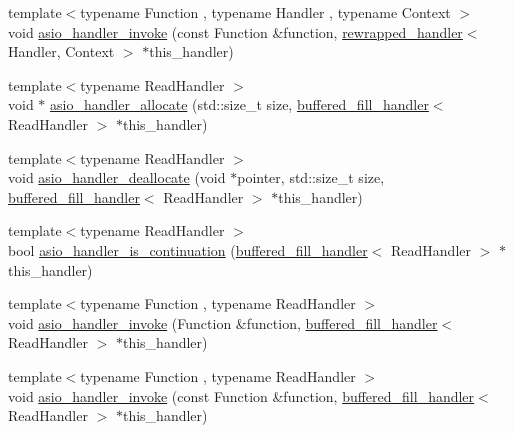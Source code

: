 \begin{DoxyCompactItemize}
\item 
{\footnotesize template$<$typename Function , typename Handler , typename Context $>$ }\\void \hyperlink{namespaceasio_1_1detail_a689ca19cf5da22c6282e16f88a683ebf}{asio\+\_\+handler\+\_\+invoke} (const Function \&function, \hyperlink{classasio_1_1detail_1_1rewrapped__handler}{rewrapped\+\_\+handler}$<$ Handler, Context $>$ $\ast$this\+\_\+handler)
\item 
{\footnotesize template$<$typename Read\+Handler $>$ }\\void $\ast$ \hyperlink{namespaceasio_1_1detail_ad866eb4cd49b68dfec440d1947274976}{asio\+\_\+handler\+\_\+allocate} (std\+::size\+\_\+t size, \hyperlink{classasio_1_1detail_1_1buffered__fill__handler}{buffered\+\_\+fill\+\_\+handler}$<$ Read\+Handler $>$ $\ast$this\+\_\+handler)
\item 
{\footnotesize template$<$typename Read\+Handler $>$ }\\void \hyperlink{namespaceasio_1_1detail_a3e663c4a7e7fd0831cf896b990c11343}{asio\+\_\+handler\+\_\+deallocate} (void $\ast$pointer, std\+::size\+\_\+t size, \hyperlink{classasio_1_1detail_1_1buffered__fill__handler}{buffered\+\_\+fill\+\_\+handler}$<$ Read\+Handler $>$ $\ast$this\+\_\+handler)
\item 
{\footnotesize template$<$typename Read\+Handler $>$ }\\bool \hyperlink{namespaceasio_1_1detail_a23e6faf84917ddf0aff36b9f222e5ae0}{asio\+\_\+handler\+\_\+is\+\_\+continuation} (\hyperlink{classasio_1_1detail_1_1buffered__fill__handler}{buffered\+\_\+fill\+\_\+handler}$<$ Read\+Handler $>$ $\ast$this\+\_\+handler)
\item 
{\footnotesize template$<$typename Function , typename Read\+Handler $>$ }\\void \hyperlink{namespaceasio_1_1detail_a4f4739227d81390e63779d1d785f2ce0}{asio\+\_\+handler\+\_\+invoke} (Function \&function, \hyperlink{classasio_1_1detail_1_1buffered__fill__handler}{buffered\+\_\+fill\+\_\+handler}$<$ Read\+Handler $>$ $\ast$this\+\_\+handler)
\item 
{\footnotesize template$<$typename Function , typename Read\+Handler $>$ }\\void \hyperlink{namespaceasio_1_1detail_a2573f334bc275162e9e2bc8fa9f89e40}{asio\+\_\+handler\+\_\+invoke} (const Function \&function, \hyperlink{classasio_1_1detail_1_1buffered__fill__handler}{buffered\+\_\+fill\+\_\+handler}$<$ Read\+Handler $>$ $\ast$this\+\_\+handler)
\item 

\end{DoxyCompactItemize}
